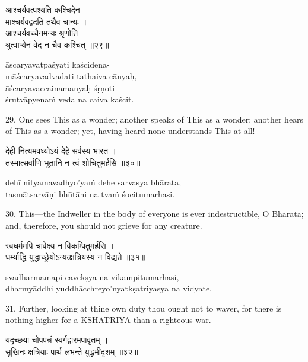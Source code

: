 \begin{gitaverse}
आश्चर्यवत्पश्यति कश्चिदेन- \\
\tab माश्चर्यवद्वदति तथैव चान्यः । \\
आश्चर्यवच्चैनमन्यः श्रृणोति \\
\tab श्रुत्वाप्येनं वेद न चैव कश्चित् ॥२९॥
\end{gitaverse}

\begin{transliteration}
āscaryavatpaśyati kaścidena- \\
\tab māścaryavadvadati tathaiva cānyaḥ, \\
āścaryavaccainamanyaḥ śṛṇoti \\
\tab śrutvāpyenaṁ veda na caiva kaścit.
\end{transliteration}

29. One sees This as a wonder; another speaks of This as a wonder; another
hears of This as a wonder; yet, having heard none understands This at all!

\begin{gitaverse}
देही नित्यमवध्योऽयं देहे सर्वस्य भारत । \\
तस्मात्सर्वाणि भूतानि न त्वं शोचितुमर्हसि ॥३०॥
\end{gitaverse}

\begin{transliteration}
dehī nityamavadhyo'yaṁ dehe sarvasya bhārata, \\
tasmātsarvāṇi bhūtāni na tvaṁ śocitumarhasi.
\end{transliteration}

30. This---the Indweller in the body of everyone is ever indestructible, O
Bharata; and, therefore, you should not grieve for any creature.

\begin{gitaverse}
स्वधर्ममपि चावेक्ष्य न विकम्पितुमर्हसि । \\
धर्म्याद्धि युद्धाच्छ्रेयोऽन्यत्क्षत्रियस्य न विद्यते ॥३१॥
\end{gitaverse}

\begin{transliteration}
svadharmamapi cāvekṣya na vikampitumarhasi, \\
dharmyāddhi yuddhācchreyo'nyatkṣatriyasya na vidyate.
\end{transliteration}

31. Further, looking at thine own duty thou ought not to waver, for there is
nothing higher for a KSHATRIYA than a righteous war.

\begin{gitaverse}
यदृच्छया चोपपन्नं स्वर्गद्वारमपावृतम् । \\
सुखिनः क्षत्रियाः पार्थ लभन्ते युद्धमीदृशम् ॥३२॥
\end{gitaverse}

